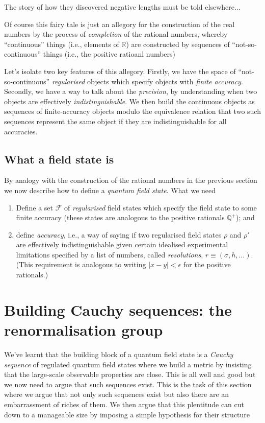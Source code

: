 \documentclass[11pt]{amsart}
\theoremstyle{plain}%
\theoremstyle{definition}
\theoremstyle{remark}
\begin{document}
The story of how they discovered negative lengths must be told elsewhere...

Of course this fairy tale is just an allegory for the construction of the real numbers by the process of \emph{completion} of the rational numbers, whereby ``continuous'' things (i.e., elements of $\mathbb{R}$) are constructed by sequences of ``not-so-continuous'' things (i.e., the positive ratioanl numbers)

Let's isolate two key features of this allegory. Firstly, we have the space of ``not-so-continuous'' \emph{regularised} objects which specify objects with \emph{finite accuracy}. Secondly, we have a way to talk about the \emph{precision}, by understanding when two objects are effectively \emph{indistinguishable}. We then build the continuous objects as sequences of finite-accuracy objects modulo the equivalence relation that two such sequences represent the same object if they are indistinguishable for all accuracies.

\subsection{What a field state is}
By analogy with the construction of the rational numbers in the previous section we now describe how to define a \emph{quantum field state}. What we need 
\begin{enumerate}
	\item Define a set $\mathcal{F}$ of \emph{regularised} field states which specify the field state to some finite accuracy (these states are analogous to the positive rationals $\mathbb{Q}^+$); and
	\item define \emph{accuracy}, i.e., a way of saying if two regularised field states $\rho$ and $\rho'$ are effectively indistinguishable given certain idealised experimental limitations specified by a list of numbers, called \emph{resolutions}, $r \equiv (\sigma, h, \ldots)$. (This requirement is analogous to writing $|x-y|<\epsilon$ for the positive rationals.)
\end{enumerate}


\section{Building Cauchy sequences: the renormalisation group}\label{sec:cauchyseqrg}

We've learnt that the building block of a quantum field state is a \emph{Cauchy sequence} of regulated quantum field states where we build a metric by insisting that the large-scale observable properties are close. This is all well and good but we now need to argue that such sequences exist. This is the task of this section where we argue that not only such sequences exist but also there are an embarrassment of riches of them. We then argue that this plentitude can cut down to a manageable size by imposing a simple hypothesis for their structure
\end{document}
